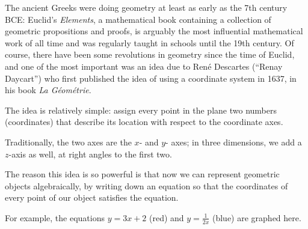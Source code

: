 



The ancient Greeks were doing geometry at least as early as the 7th century BCE: Euclid's \textit{Elements}, a mathematical book containing a collection
of geometric propositions and proofs, is arguably the most influential mathematical work of all time and was regularly taught in schools until the 19th
century. Of course, there have been some revolutions in geometry since the time of Euclid, and one of the most important was an idea due to Ren\'e Descartes
(``Renay Daycart'') who first published the idea of using a coordinate system in 1637, in his book \textit{La G\'eom\'etrie}.

The idea is relatively simple: assign every point in the plane two numbers (coordinates) that describe its location with respect to the coordinate axes.

\begin{center}
\end{center}

Traditionally, the two axes are the $ x$- and $ y$- axes; in three dimensions, we add a $ z$-axis as well, at right angles to the first two.

The reason this idea is so powerful is that now we can represent geometric objects algebraically, by writing down an equation so that the coordinates
of every point of our object satisfies the equation.

For example, the equations $ y = 3x + 2 $ (red) and $ y = \frac{1}{2x} $ (blue) are graphed here.
\begin{center}
\end{center}

